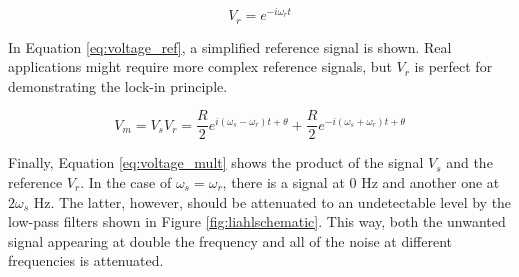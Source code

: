 \begin{equation}\label{eq:voltage_ref}
	V_r = e^{-i\omega_rt}
\end{equation}

In Equation \eqref{eq:voltage_ref}, a simplified reference signal is shown. Real applications might require more complex reference signals, but $V_r$ is perfect for demonstrating the lock-in principle.

\begin{equation}\label{eq:voltage_mult}
	V_m = V_sV_r = \frac{R}{2}e^{i(\omega_s -\omega_r)t  + \theta} + \frac{R}{2}e^{-i(\omega_s +\omega_r)t + \theta}
\end{equation}

Finally, Equation \eqref{eq:voltage_mult} shows the product of the signal $V_s$ and the reference $V_r$. In the case of $\omega_s = \omega_r$, there is a signal at \num{0} \unit{\hertz} and another one at $2\omega_s$ \unit{\hertz}. The latter, however, should be attenuated to an undetectable level by the low-pass filters shown in Figure \ref{fig:liahlschematic}. This way, both the unwanted signal appearing at double the frequency and all of the noise at different frequencies is attenuated.


